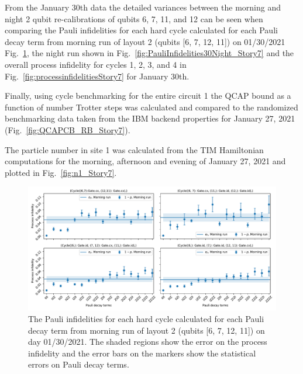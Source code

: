 From the January 30th data the detailed variances between the morning and night 2 qubit re-calibrations of qubits 6, 7, 11, and 12 can be seen when comparing the Pauli infidelities for each hard cycle calculated for each Pauli decay term from morning run of layout 2 (qubits [6, 7, 12, 11]) on 01/30/2021 
Fig.~\ref{fig:PauliInfidelities30Morning_Story7}, 
the night run shown in Fig.~\ref{fig:PauliInfidelities30Night_Story7} 
and the overall process infidelity for cycles 1, 2, 3, and 4 in Fig.~\ref{fig:processinfidelitiesStory7} for January 30th.

Finally, using cycle benchmarking for the entire circuit 1 the QCAP bound as a function of number Trotter steps was calculated and compared to the randomized benchmarking data taken from the IBM backend properties for January 27, 2021 (Fig.~\ref{fig:QCAPCB_RB_Story7}).

The particle number in site 1 was calculated from the TIM Hamiltonian computations for the morning, afternoon and evening of January 27, 2021 and plotted in Fig.~\ref{fig:n1_Story7}.




\begin{figure}[htpb]
    \includegraphics[scale=0.56]{CBPauliInfidelities_30_01_2021_MorningRun_Layout2_Cycle1_2_3_4.pdf}
    \caption{The Pauli infidelities for each hard cycle calculated for each Pauli decay term from morning run of layout 2 (qubits [6, 7, 12, 11]) on day 01/30/2021. The shaded regions show the error on the process infidelity and the error bars on the markers show the statistical errors on Pauli decay terms. }
    \label{fig:PauliInfidelities30Morning_Story7}
\end{figure}



